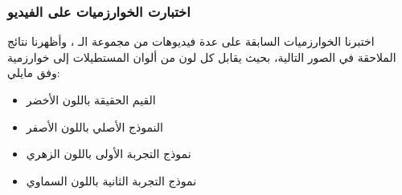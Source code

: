 \subsubsection{اختبارت الخوارزميات على  الفيديو}
اختبرنا الخوارزميات السابقة على عدة فيديوهات من مجموعة الـ 
، 
وأظهرنا نتائج الملاحقة في الصور التالية، بحيث يقابل كل لون من ألوان المستطيلات إلى خوارزمية وفق مايلي:
\begin{itemize}
	\item 	القيم الحقيقة باللون الأخضر
	\item
	النموذج الأصلي 
	باللون الأصفر
	\item
	نموذج التجربة الأولى
	باللون الزهري
	\item
	نموذج التجربة الثانية
	باللون السماوي
\end{itemize}

